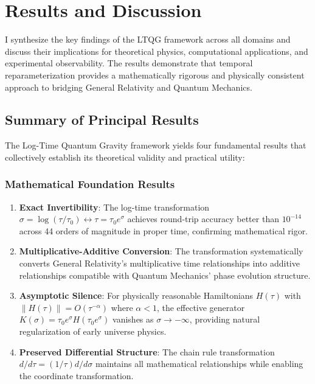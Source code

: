 \section{Results and Discussion}
\label{sec:results_discussion}

I synthesize the key findings of the LTQG framework across all domains and discuss their implications for theoretical physics, computational applications, and experimental observability. The results demonstrate that temporal reparameterization provides a mathematically rigorous and physically consistent approach to bridging General Relativity and Quantum Mechanics.

\subsection{Summary of Principal Results}
\label{subsec:principal_results}

The Log-Time Quantum Gravity framework yields four fundamental results that collectively establish its theoretical validity and practical utility:

\subsubsection{Mathematical Foundation Results}

\begin{enumerate}
\item \textbf{Exact Invertibility}: The log-time transformation $\sigma = \log(\tau/\tau_0) \leftrightarrow \tau = \tau_0 e^\sigma$ achieves round-trip accuracy better than $10^{-14}$ across 44 orders of magnitude in proper time, confirming mathematical rigor.

\item \textbf{Multiplicative-Additive Conversion}: The transformation systematically converts General Relativity's multiplicative time relationships into additive relationships compatible with Quantum Mechanics' phase evolution structure.

\item \textbf{Asymptotic Silence}: For physically reasonable Hamiltonians $H(\tau)$ with $\|H(\tau)\| = O(\tau^{-\alpha})$ where $\alpha < 1$, the effective generator $K(\sigma) = \tau_0 e^\sigma H(\tau_0 e^\sigma)$ vanishes as $\sigma \to -\infty$, providing natural regularization of early universe physics.

\item \textbf{Preserved Differential Structure}: The chain rule transformation $d/d\tau = (1/\tau) d/d\sigma$ maintains all mathematical relationships while enabling the coordinate transformation.
\end{enumerate}

